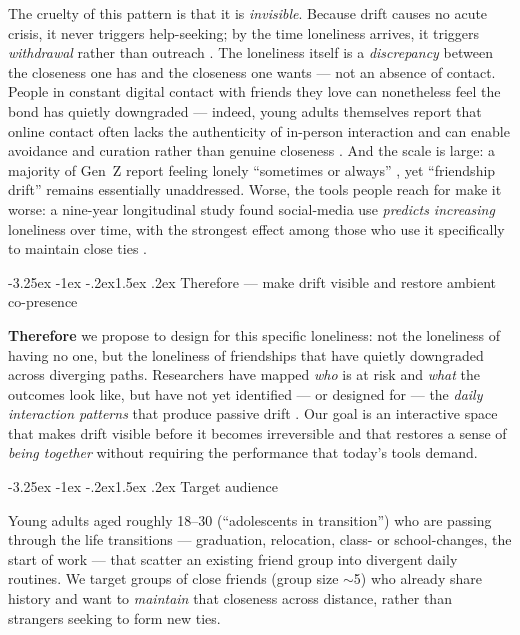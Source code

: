 \documentclass[11pt]{article}
\makeatletter
\renewcommand\subsection{\@startsection{subsection}{2}{\z@}%
  {-3.25ex \@plus -1ex \@minus -.2ex}{1.5ex \@plus .2ex}%
  {\normalfont\large\bfseries\color{accent}}}
\makeatother
\begin{document}
The cruelty of this pattern is that it is \emph{invisible}. Because drift causes
no acute crisis, it never triggers help-seeking; by the time loneliness arrives,
it triggers \emph{withdrawal} rather than outreach \citep{cacioppo2015}. The
loneliness itself is a \emph{discrepancy} between the closeness one has and the
closeness one wants \citep{grigoriadis2024, hall2025} --- not an absence of
contact. People in constant digital contact with friends they love can
nonetheless feel the bond has quietly downgraded --- indeed, young adults
themselves report that online contact often lacks the authenticity of in-person
interaction and can enable avoidance and curation rather than genuine closeness
\citep{scott2022}. And the scale is large: a
majority of Gen~Z report feeling lonely ``sometimes or always''
\citep{cigna2020}, yet ``friendship drift'' remains essentially unaddressed.
Worse, the tools people reach for make it worse: a nine-year longitudinal study
found social-media use \emph{predicts increasing} loneliness over time, with the
strongest effect among those who use it specifically to maintain close ties
\citep{robertsyoungdavid2025}.

\subsection{Therefore --- make drift visible and restore ambient co-presence}

\textbf{Therefore} we propose to design for this specific loneliness: not the
loneliness of having no one, but the loneliness of friendships that have quietly
downgraded across diverging paths. Researchers have mapped \emph{who} is at risk
and \emph{what} the outcomes look like, but have not yet identified --- or
designed for --- the \emph{daily interaction patterns} that produce passive
drift \citep{santucci2025, hansen2025}. Our goal is an interactive space that
makes drift visible before it becomes irreversible and that restores a sense of
\emph{being together} without requiring the performance that today's tools
demand.

\subsection{Target audience}

Young adults aged roughly 18--30 (``adolescents in transition'') who are passing
through the life transitions --- graduation, relocation, class- or
school-changes, the start of work --- that scatter an existing friend group into
divergent daily routines. We target groups of close friends (group size $\sim$5)
who already share history and want to \emph{maintain} that closeness across
distance, rather than strangers seeking to form new ties.
\end{document}
